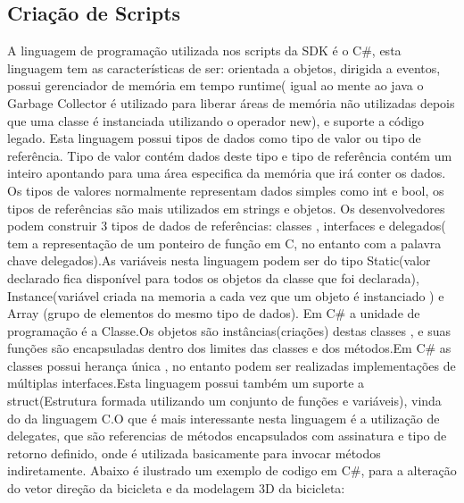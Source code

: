 \subsection{Criação de Scripts}
\label{sub:criacao_de_scripts}
       A linguagem de programação utilizada nos scripts da SDK é o C\#, esta linguagem tem as características de ser: orientada a objetos, dirigida a eventos, possui gerenciador de memória em tempo runtime( igual ao mente ao java o Garbage Collector é utilizado para liberar áreas de memória não utilizadas depois que uma classe é instanciada utilizando o operador new), e suporte a código legado.
       Esta linguagem possui tipos de dados como tipo de valor ou tipo de referência. Tipo de valor contém dados deste tipo e tipo de referência contém um inteiro apontando para uma área especifica da memória que irá conter os dados. Os tipos de valores normalmente representam dados simples como int e bool, os tipos de referências são mais utilizados em strings e objetos. Os desenvolvedores podem construir 3 tipos de dados de referências: classes , interfaces e delegados( tem a representação de um ponteiro de função em C, no entanto com a palavra chave delegados).As variáveis nesta linguagem podem ser do tipo Static(valor declarado fica disponível para todos os objetos da classe que foi declarada), Instance(variável criada na memoria a cada vez que um  objeto é instanciado ) e Array (grupo de elementos do mesmo tipo de dados).
      Em C\# a unidade de programação é a Classe.Os objetos são instâncias(criações) destas classes , e suas funções são encapsuladas dentro dos limites  das classes e dos métodos.Em C\# as classes possui herança única , no entanto podem ser realizadas implementações de múltiplas interfaces.Esta linguagem possui também um suporte a struct(Estrutura formada utilizando um conjunto de funções e variáveis), vinda do da linguagem C.O que é mais interessante nesta linguagem é a utilização de delegates, que são referencias de métodos encapsulados com assinatura e tipo de retorno definido, onde é utilizada basicamente para invocar métodos indiretamente.
      Abaixo é ilustrado um exemplo de codigo em C\#, para a alteração do vetor direção da bicicleta e da modelagem 3D da bicicleta: 
 
